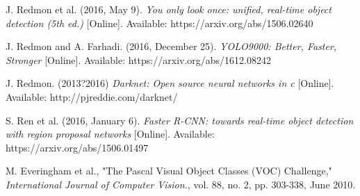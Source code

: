 \documentclass[conference]{IEEEtran}
\begin{document}
%
%
\begin{thebibliography}{1}
%
%

J. Redmon et al. (2016, May 9). 
\textit{You only look once: unified, real-time object detection (5th ed.)} [Online]. Available: https://arxiv.org/abs/1506.02640

J. Redmon and A. Farhadi. (2016, December 25). 
\textit{YOLO9000: Better, Faster, Stronger} [Online]. Available: https://arxiv.org/abs/1612.08242

J. Redmon. (2013?2016) 
\textit{Darknet: Open source neural networks in c} [Online]. Available: http://pjreddie.com/darknet/

S. Ren et al. (2016, January 6). 
\textit{Faster R-CNN: towards real-time object detection with region proposal networks} [Online]. Available: https://arxiv.org/abs/1506.01497


M. Everingham et al., "The Pascal Visual Object Classes (VOC) Challenge,"
\textit{International Journal of Computer Vision.}, vol. 88, no. 2, pp. 303-338, June 2010.


\end{thebibliography}




\end{document}
